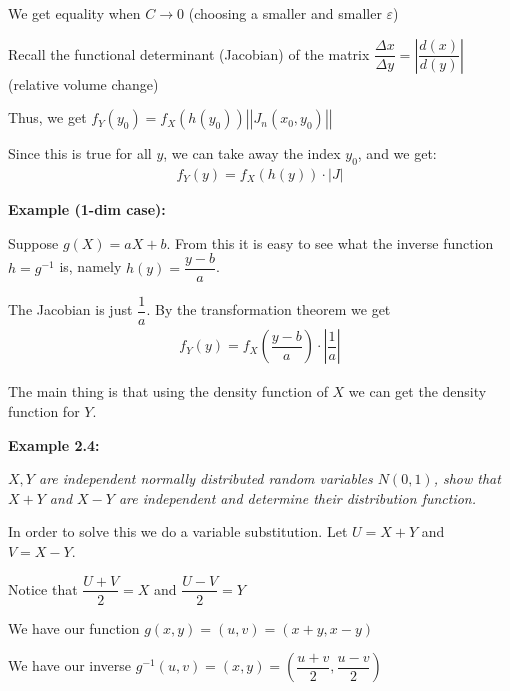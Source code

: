 \begin{prf}{}
  \par\bigskip
  \noindent We get equality when $C\to0$ (choosing a smaller and smaller $\varepsilon$)
  \par\bigskip
  \noindent Recall the functional determinant (Jacobian) of the matrix $\dfrac{\Delta x}{\Delta y} = \left|\dfrac{d(x)}{d(y)}\right|$ (relative volume change)
  \par\bigskip
  \noindent Thus, we get $f_Y(y_0) = f_X(h(y_0))\left|\left|J_n(x_0,y_0)\right|\right|$\par
  \noindent Since this is true for all $y$, we can take away the index $y_0$, and we get:
  \begin{equation*}
    \begin{gathered}
      f_Y(y) = f_X(h(y))\cdot\left|J\right|
    \end{gathered}
  \end{equation*}
\end{prf}
\par\bigskip
\noindent\textbf{Example (1-dim case):}\par
\noindent Suppose $g(X)=aX+b$. From this it is easy to see what the inverse function $h = g^{-1}$ is, namely $h(y) = \dfrac{y-b}{a}$.
\par\bigskip
\noindent The Jacobian is just $\dfrac{1}{a}$. By the transformation theorem we get
\begin{equation*}
  \begin{gathered}
    f_Y(y) = f_X\left(\dfrac{y-b}{a}\right)\cdot\left|\dfrac{1}{a}\right|
  \end{gathered}
\end{equation*}
\par\bigskip
\noindent The main thing is that using the density function of $X$ we can get the density function for $Y$.
\par\bigskip
\noindent\textbf{Example 2.4:}\par
\textit{$X,Y$ are independent normally distributed random variables $N(0,1)$, show that $X+Y$ and $X-Y$ are independent and determine their distribution function.}
\par\bigskip
\noindent In order to solve this we do a variable substitution. Let $U = X+Y$ and $V = X-Y$.\par
\noindent Notice that $\dfrac{U+V}{2} = X$ and $\dfrac{U-V}{2} = Y$\par
\noindent We have our function $g(x,y) = (u,v) = (x+y,x-y)$\par
\noindent We have our inverse $g^{-1}(u,v) = (x,y) = \left(\dfrac{u+v}{2}, \dfrac{u-v}{2}\right)$\par
